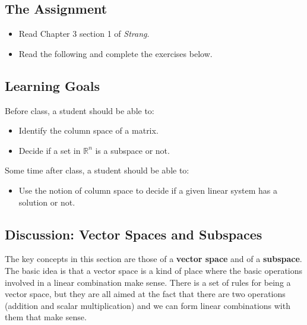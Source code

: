 \documentclass[10pt,]{book}
\newcommand{\terminology}[1]{\textbf{#1}}
\theoremstyle{plain}
\numberwithin{equation}{section}
\begin{document}
\subsection[The Assignment]{The Assignment}\label{subsection-58}
\begin{itemize}
\item{}Read Chapter 3 section 1 of \emph{Strang}.\item{}Read the following and complete the exercises below.\end{itemize}
\typeout{************************************************}
\typeout{************************************************}
\subsection[Learning Goals]{Learning Goals}\label{subsection-59}
Before class, a student should be able to:%
\begin{itemize}
\item{}Identify the column space of a matrix.\item{}Decide if a set in \(\mathbb{R}^n\) is a subspace or not.\end{itemize}
\par
Some time after class, a student should be able to:%
\begin{itemize}
\item{}
        Use the notion of column space to decide if a given linear system has a
        solution or not.
      \end{itemize}
\typeout{************************************************}
\typeout{************************************************}
\subsection[Discussion: Vector Spaces and Subspaces]{Discussion: Vector Spaces and Subspaces}\label{subsection-60}

      The key concepts in this section are those of a \terminology{vector space}
      and of a \terminology{subspace}. The basic idea is that a vector space is
      a kind of place where the basic operations involved in a linear
      combination make sense. There is a set of rules for being a vector space,
      but they are all aimed at the fact that there are two operations
      (addition and scalar multiplication) and we can form linear combinations
      with them that make sense.
\par
\end{document}
